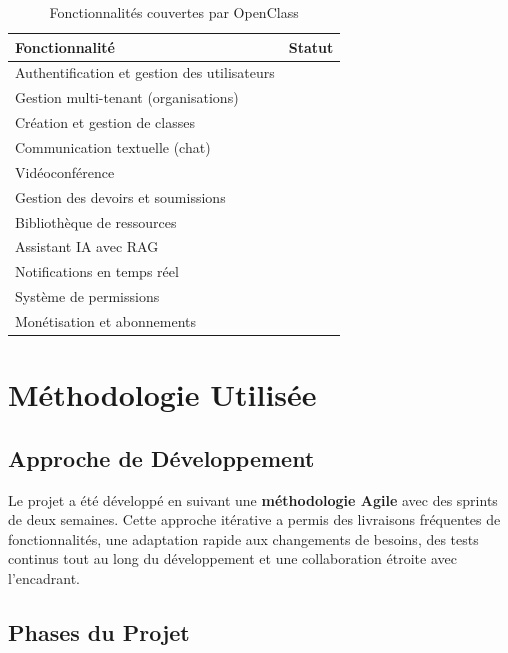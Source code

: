 \documentclass[12pt, a4paper, twoside]{report}
\newcommand{\cmark}{\ding{51}}
\begin{document}
\begin{table}[H]
  
  \begin{tabularx}{\textwidth}{|X|c|}
    \hline
    \textbf{Fonctionnalité} & \textbf{Statut} \\
    \hline
    Authentification et gestion des utilisateurs & \cmark \\
    Gestion multi-tenant (organisations)         & \cmark \\
    Création et gestion de classes               & \cmark \\
    Communication textuelle (chat)               & \cmark \\
    Vidéoconférence                 & \cmark \\
    Gestion des devoirs et soumissions           & \cmark \\
    Bibliothèque de ressources                   & \cmark \\
    Assistant IA avec RAG                        & \cmark \\
    Notifications en temps réel                  & \cmark \\
    Système de permissions                       & \cmark \\
    Monétisation et abonnements          & \cmark \\
    \hline
  \end{tabularx}
  \label{tab:features}
  \caption{Fonctionnalités couvertes par OpenClass}
\end{table}

\section{Méthodologie Utilisée}

\subsection{Approche de Développement}

Le projet a été développé en suivant une \textbf{méthodologie Agile} avec des
sprints de deux semaines. Cette approche itérative a permis des livraisons
fréquentes de fonctionnalités, une adaptation rapide aux changements de besoins,
des tests continus tout au long du développement et une collaboration étroite avec
l'encadrant.

\subsection{Phases du Projet}
\end{document}
